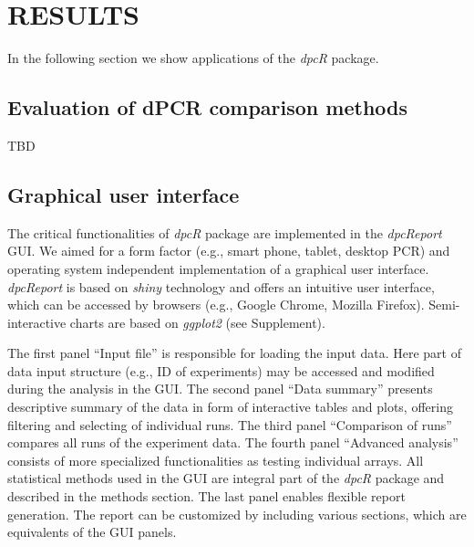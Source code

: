\documentclass[a4,center,fleqn]{NAR}
\begin{document}
\section{RESULTS}

In the following section we show applications of the \textit{dpcR} package.

\subsection{Evaluation of dPCR comparison methods}

TBD

\subsection{Graphical user interface}

The critical functionalities of \textit{dpcR} package are implemented in the 
\textit{dpcReport} GUI. We aimed for a form factor (e.g., smart phone, tablet, 
desktop PCR) and operating system independent implementation of a graphical 
user 
interface. \textit{dpcReport} is based on \textit{shiny} technology and offers 
an intuitive user interface, which can be accessed by browsers (e.g., Google 
Chrome, Mozilla Firefox). Semi-interactive charts are based on \textit{ggplot2} 
(see Supplement).

The first panel ``Input file'' is responsible for loading the input data. Here 
part of data input structure (e.g., ID of experiments) may be accessed and 
modified during the analysis in the GUI. The second panel ``Data summary'' 
presents descriptive summary of the data in form of interactive tables and 
plots, offering filtering and selecting of individual runs. The third panel 
``Comparison of runs'' compares all runs of the experiment data. The fourth 
panel ``Advanced analysis'' consists of more specialized functionalities as 
testing individual arrays. All statistical methods used in the GUI are integral 
part of the \textit{dpcR} package and described in the methods section. The 
last 
panel enables flexible report generation. The report can be customized by 
including various sections, which are equivalents of the GUI panels.
\end{document}
